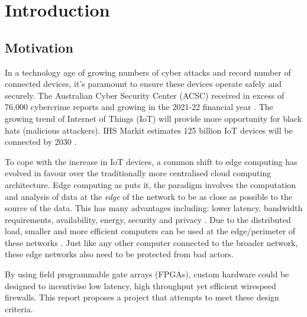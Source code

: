 \chapter[Introduction]{Introduction}
\label{Chap:Intro}



\section{Motivation}


In a technology age of growing numbers of cyber attacks and record number of connected devices, it's 
paramount to ensure these devices operate safely and securely. The Australian Cyber Security Center (ACSC) received in 
excess of 76,000 cybercrime reports and growing in the 2021-22 financial year \cite{acsc_2022}. The growing trend of Internet of Things (IoT) will provide 
more opportunity for black hats (malicious attackers). IHS Markit estimates 125 billion IoT devices will be connected by 2030 \cite{IHS_iot}. 

To cope with the increase in IoT devices, a common shift to edge computing has evolved in favour over the traditionally more centralised cloud computing 
architecture. Edge computing as \cite{EdgeComputing} puts it, the paradigm involves the computation and analysis of data 
at the \textit{edge} of the network to be as close as possible to the source of the data. This has many advantages including: lower latency, bandwidth requirements,
availability, energy, security and privacy \cite{EdgeComputing}. Due to the distributed load, smaller and more efficient computers can be used 
at the edge/perimeter of these networks \cite{EdgeComputingPerspectives}. Just like any other computer connected to the broader network, these 
edge networks also need to be protected from bad actors.


By using field programmable gate arrays (FPGAs), custom hardware could be designed to incentivise low latency, high throughput yet efficient wirespeed firewalls. 
This report proposes a project that attempts to meet these design criteria. 


